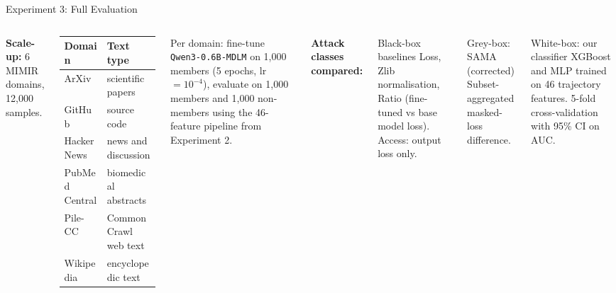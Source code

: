 \documentclass[aspectratio=169,10pt]{beamer}
\newcommand{\code}[1]{\texttt{\small #1}}
\begin{document}
\begin{frame}{Experiment 3: Full Evaluation}

\begin{columns}[T]

  \textbf{Scale-up:} 6 MIMIR domains, 12{,}000 samples.

  \medskip
  \begin{tabular}{@{}ll@{}}
    \toprule
    \textbf{Domain} & \textbf{Text type} \\
    \midrule
    ArXiv           & scientific papers \\
    GitHub          & source code \\
    HackerNews      & news and discussion \\
    PubMed Central  & biomedical abstracts \\
    Pile-CC         & CommonCrawl web text \\
    Wikipedia       & encyclopedic text \\
    \bottomrule
  \end{tabular}

  \medskip
  Per domain: fine-tune \code{Qwen3-0.6B-MDLM} on 1{,}000 members
  (5 epochs, lr $= 10^{-4}$), evaluate on 1{,}000 members and 1{,}000
  non-members using the 46-feature pipeline from Experiment 2.

  \textbf{Attack classes compared:}

  \medskip
  \begin{block}{Black-box baselines}
    Loss, Zlib normalisation, Ratio (fine-tuned vs base model loss).
    Access: output loss only.
  \end{block}

  \begin{block}{Grey-box: SAMA (corrected)}
    Subset-aggregated masked-loss difference.
  \end{block}

  \begin{block}{White-box: our classifier}
    XGBoost and MLP trained on 46 trajectory features.
    5-fold cross-validation with 95\% CI on AUC.
  \end{block}
\end{columns}

\end{frame}
\end{document}

